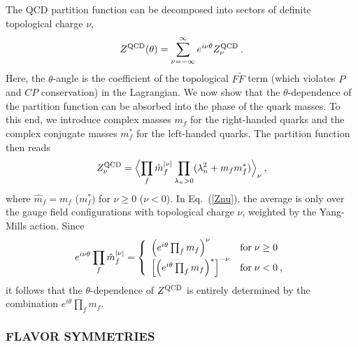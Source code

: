 The QCD partition function can be decomposed into sectors of definite
topological charge $\nu$,
\begin{equation}
  \label{Ztheta}
  Z^{\rm QCD}(\theta)=
  \sum_{\nu=-\infty}^\infty e^{i\nu\theta}Z_\nu^{\rm QCD}\:.
\end{equation}
Here, the $\theta$-angle is the coefficient of the topological 
$F\tilde F$ term (which violates $P$ and $CP$ conservation) in the
Lagrangian.  We now show that the $\theta$-dependence of the partition
function can be absorbed into the phase of the quark masses.  To this
end, we introduce complex masses $m_f$ for the right-handed quarks and
the complex conjugate masses $m_f^*$ for the left-handed quarks.  The
partition function then reads
\begin{equation}
  \label{Znu}
  Z_\nu^{\rm QCD}=\Bigl\langle\prod_f\hat m_f^{|\nu|}\prod_{\lambda_n>0}
  (\lambda_n^2+m_fm_f^*)\Bigr\rangle_\nu\:,
\end{equation}
where $\hat m_f=m_f$ ($m_f^*$) for $\nu\ge0$ ($\nu<0$).  In
Eq.~(\ref{Znu}), the average is only over the gauge field
configurations with topological charge $\nu$, weighted by the
Yang-Mills action.  Since
\begin{equation}
   e^{i\nu\theta}\prod_f\hat m_f^{|\nu|}=\left\{
     \begin{array}{ll}
       \left(e^{i\theta}\prod_f m_f\right)^\nu & {\rm for}\;\nu\ge0\\
       \left[\left(e^{i\theta}\prod_f m_f\right)^*\right]^{-\nu} & 
       {\rm for}\;\nu<0\:,
     \end{array}
   \right.
\end{equation}
it follows that the $\theta$-dependence of $Z^{\rm QCD}$ is entirely
determined by the combination $e^{i\theta}\prod_f m_f$.

\subsubsection{FLAVOR SYMMETRIES}
\label{FlavorSymmetries}

